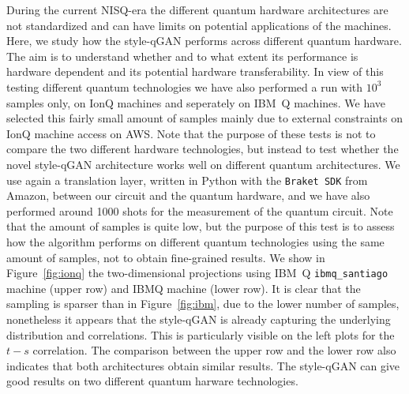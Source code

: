 \documentclass[twocolumn,preprintnumbers,superscriptaddress]{revtex4-2}
\begin{document}
During the current NISQ-era the different quantum hardware architectures are not standardized and can have limits
on potential applications of the machines. Here, we study how the style-qGAN  performs across different quantum hardware.
The aim is to understand whether and to what extent its performance is hardware dependent and its potential hardware transferability.
In view of this testing different quantum technologies we have also performed a run
with $10^3$ samples only, on IonQ machines and seperately on IBM~Q
machines. We have selected this fairly small amount of samples
mainly due to external constraints on IonQ machine access on AWS.
Note that the purpose of these tests is not to compare the two different hardware technologies,
but instead to test whether the novel style-qGAN architecture works well on different quantum architectures.
We use again a translation layer, written in Python with the
\texttt{Braket SDK} from Amazon, between our circuit and the quantum hardware, and we
have also performed around 1000 shots for the measurement of the quantum circuit.
Note that the amount of samples is quite low, but the purpose of this test is to assess
how the algorithm performs on different quantum technologies using the same amount of
samples, not to obtain fine-grained results. We show in Figure~\ref{fig:ionq} the two-dimensional projections using
IBM~Q  {\tt ibmq\_santiago} machine (upper row) and IBMQ machine (lower row).
It is clear that the sampling is sparser than in Figure~\ref{fig:ibm}, due to the lower number of
samples, nonetheless it appears that the style-qGAN is already capturing the underlying
distribution and correlations. This is particularly visible on the left plots for the $t-s$ correlation.
The comparison between the upper row and the lower row also indicates that both architectures
obtain similar results. The style-qGAN can give good results on two different quantum harware
technologies.
\end{document}
